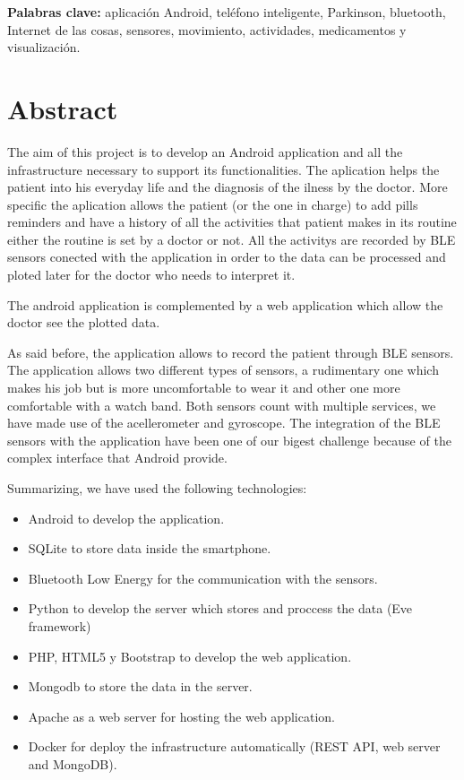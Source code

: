 \documentclass[11pt,spanish]{article}
\begin{document}
{\bf Palabras clave:} aplicación Android, teléfono inteligente, Parkinson, bluetooth, Internet de las cosas, sensores, movimiento, actividades, medicamentos y visualización.
\newpage

\section{Abstract}
The aim of this project is to develop an Android application and all the infrastructure necessary to support its functionalities. The aplication helps the patient into his everyday life and the diagnosis of the ilness by the doctor. More specific the aplication allows the patient (or the one in charge) to add pills reminders and have a history of all the activities that patient makes in its routine either the routine is set by a doctor or not. All the activitys are recorded by BLE sensors conected with the application in order to the data can be processed  and ploted later for the doctor who needs to interpret it.
\newline

The android application is complemented by a web application which allow the doctor see the plotted data.
\newline

As said before, the application allows to record the patient through BLE sensors. The application allows two different types of sensors, a rudimentary one which makes his job but is more uncomfortable to wear it and other one more comfortable with a watch band. Both sensors count with multiple services, we have made use of the acellerometer and gyroscope. The integration of the BLE sensors with the application have been one of our bigest challenge because of the complex interface that Android provide.
\newline

Summarizing, we have used the following technologies:

\begin{itemize}
    \item Android to develop the application. 
	\item SQLite to store data inside the smartphone. 
	\item Bluetooth Low Energy for the communication with the sensors. 
	\item Python to develop the server which stores and proccess the data (Eve framework)
    \item PHP, HTML5 y Bootstrap to develop the web application.
	\item Mongodb to store the data in the server.
    \item Apache as a web server for hosting the web application.
    \item Docker for deploy the infrastructure automatically (REST API, web server and MongoDB). 
    \newline
\end{itemize}
\newpage
\end{document}
